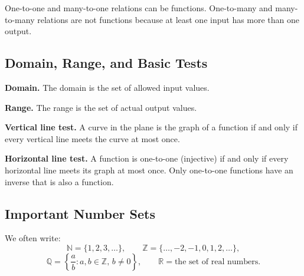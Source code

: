 \documentclass[12pt]{article}
\theoremstyle{definition}
\begin{document}
\begin{center}
\end{center}

One-to-one and many-to-one relations can be functions. One-to-many and many-to-many relations are not functions because at least one input has more than one output.

\subsection{Domain, Range, and Basic Tests}

\textbf{Domain.} The domain is the set of allowed input values.

\textbf{Range.} The range is the set of actual output values.

\textbf{Vertical line test.} A curve in the plane is the graph of a function if and only if every vertical line meets the curve at most once.

\textbf{Horizontal line test.} A function is one-to-one (injective) if and only if every horizontal line meets its graph at most once. Only one-to-one functions have an inverse that is also a function.

\subsection{Important Number Sets}

We often write:
\[
\mathbb{N} = \{1,2,3,\dots\}, \qquad
\mathbb{Z} = \{\dots,-2,-1,0,1,2,\dots\},
\]
\[
\mathbb{Q} = \left\{\frac{a}{b} : a,b \in \mathbb{Z},\, b \ne 0\right\}, \qquad
\mathbb{R} = \text{the set of real numbers}.
\]
\end{document}
